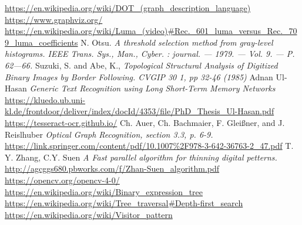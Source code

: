 \documentclass[makeidx, a4paper, 14pt]{extarticle}
\begin{document}
\begin{thebibliography}{}
     \url{https://en.wikipedia.org/wiki/DOT_(graph_description_language)}
        \url{https://www.graphviz.org/}
     \url{https://en.wikipedia.org/wiki/Luma_(video)#Rec._601_luma_versus_Rec._709_luma_coefficients}
     N. Otsu.
        \textit{A threshold selection method from gray-level histograms. IEEE Trans. Sys., Man., Cyber. : journal. — 1979. — Vol. 9. — P. 62—66.}
     Suzuki, S. and Abe, K.,
        \textit{Topological Structural Analysis of Digitized Binary Images by Border Following. CVGIP 30 1, pp 32-46 (1985)}
     Adnan Ul-Hasan
        \textit{Generic Text Recognition using Long Short-Term Memory Networks}
        \url{https://kluedo.ub.uni-kl.de/frontdoor/deliver/index/docId/4353/file/PhD_Thesis_Ul-Hasan.pdf}
        \url{https://tesseract-ocr.github.io/}
     Ch. Auer, Ch. Bachmaier, F. Gleißner, and J. Reislhuber
        \textit{Optical Graph Recognition, section 3.3, p. 6-9.}
        \url{https://link.springer.com/content/pdf/10.1007%2F978-3-642-36763-2_47.pdf}
      T. Y. Zhang, C.Y. Suen
        \textit{A Fast parallel algorithm for thinning digital petterns.}
        \url{http://agcggs680.pbworks.com/f/Zhan-Suen_algorithm.pdf}
        \url{https://opencv.org/opencv-4-0/}
        \url{https://en.wikipedia.org/wiki/Binary_expression_tree}
        \url{https://en.wikipedia.org/wiki/Tree_traversal#Depth-first_search}
        \url{https://en.wikipedia.org/wiki/Visitor_pattern}
\end{thebibliography}
\end{document}
